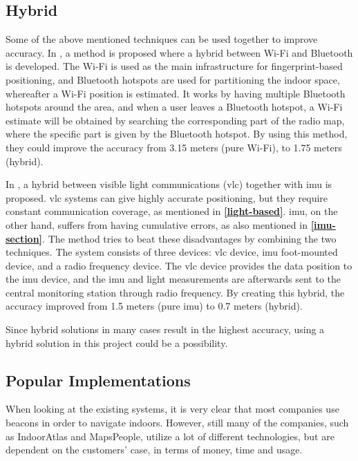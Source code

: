 \subsection{Hybrid} \label{sec:hybrid}
Some of the above mentioned techniques can be used together to improve accuracy. In \cite{aauhybrid}, a method is proposed where a hybrid between Wi-Fi and Bluetooth is developed. The Wi-Fi is used as the main infrastructure for fingerprint-based positioning, and Bluetooth hotspots are used for partitioning the indoor space, whereafter a Wi-Fi position is estimated. It works by having multiple Bluetooth hotspots around the area, and when a user leaves a Bluetooth hotspot, a Wi-Fi estimate will be obtained by searching the corresponding part of the radio map, where the specific part is given by the Bluetooth hotspot. By using this method, they could improve the accuracy from 3.15 meters (pure Wi-Fi), to 1.75 meters (hybrid).

In \cite{9249516}, a hybrid between visible light communications (\gls{vlc}) together with \gls{imu} is proposed. \gls{vlc} systems can give highly accurate positioning, but they require constant communication coverage, as mentioned in \textbf{\ref{light-based}}. \gls{imu}, on the other hand, suffers from having cumulative errors, as also mentioned in \textbf{\ref{imu-section}}. The method tries to beat these disadvantages by combining the two techniques. The system consists of three devices: \gls{vlc} device, \gls{imu} foot-mounted device, and a radio frequency device. The \gls{vlc} device provides the data position to the \gls{imu} device, and the \gls{imu} and light measurements are afterwards sent to the central monitoring station through radio frequency. By creating this hybrid, the accuracy improved from 1.5 meters (pure \gls{imu}) to 0.7 meters (hybrid).

Since hybrid solutions in many cases result in the highest accuracy, using a hybrid solution in this project could be a possibility.

\subsection{Popular Implementations}
When looking at the existing systems, it is very clear that most companies use beacons in order to navigate indoors\cite{IPSMapsPeople}. However, still many of the companies, such as IndoorAtlas and MapsPeople, utilize a lot of different technologies, but are dependent on the customers' case, in terms of money, time and usage\cite{IndoorAtlas}.

